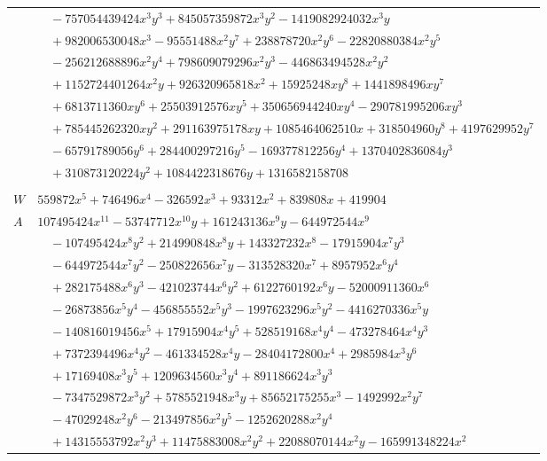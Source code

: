 \documentclass[11pt]{article}
\begin{document}
\begin{longtable}{@{}ll@{}}
 & $\quad -757054439424x^{3}y^{3}+845057359872x^{3}y^{2}-1419082924032x^{3}y$\\
 & $\quad +982006530048x^{3}-95551488x^{2}y^{7}+238878720x^{2}y^{6}-22820880384x^{2}y^{5}$\\
 & $\quad -256212688896x^{2}y^{4}+798609079296x^{2}y^{3}-446863494528x^{2}y^{2}$\\
 & $\quad +1152724401264x^{2}y+926320965818x^{2}+15925248xy^{8}+1441898496xy^{7}$\\
 & $\quad +6813711360xy^{6}+25503912576xy^{5}+350656944240xy^{4}-290781995206xy^{3}$\\
 & $\quad +785445262320xy^{2}+291163975178xy+1085464062510x+318504960y^{8}+4197629952y^{7}$\\
 & $\quad -65791789056y^{6}+284400297216y^{5}-169377812256y^{4}+1370402836084y^{3}$\\
 & $\quad +310873120224y^{2}+1084422318676y+1316582158708$\\
\addlinespace[3pt]
\multicolumn{2}{@{}l}{$i=34$, $m=5184$, neighbours $114,10,37,62,64,70,91,96,99$}\\
$W$ & $559872x^{5}+746496x^{4}-326592x^{3}+93312x^{2}+839808x+419904$\\
$A$ & $107495424x^{11}-53747712x^{10}y+161243136x^{9}y-644972544x^{9}$\\
 & $\quad -107495424x^{8}y^{2}+214990848x^{8}y+143327232x^{8}-17915904x^{7}y^{3}$\\
 & $\quad -644972544x^{7}y^{2}-250822656x^{7}y-313528320x^{7}+8957952x^{6}y^{4}$\\
 & $\quad +282175488x^{6}y^{3}-421023744x^{6}y^{2}+6122760192x^{6}y-52000911360x^{6}$\\
 & $\quad -26873856x^{5}y^{4}-456855552x^{5}y^{3}-1997623296x^{5}y^{2}-4416270336x^{5}y$\\
 & $\quad -140816019456x^{5}+17915904x^{4}y^{5}+528519168x^{4}y^{4}-473278464x^{4}y^{3}$\\
 & $\quad +7372394496x^{4}y^{2}-461334528x^{4}y-28404172800x^{4}+2985984x^{3}y^{6}$\\
 & $\quad +17169408x^{3}y^{5}+1209634560x^{3}y^{4}+891186624x^{3}y^{3}$\\
 & $\quad -7347529872x^{3}y^{2}+5785521948x^{3}y+85652175255x^{3}-1492992x^{2}y^{7}$\\
 & $\quad -47029248x^{2}y^{6}-213497856x^{2}y^{5}-1252620288x^{2}y^{4}$\\
 & $\quad +14315553792x^{2}y^{3}+11475883008x^{2}y^{2}+22088070144x^{2}y-165991348224x^{2}$\\

\end{longtable}
\end{document}
